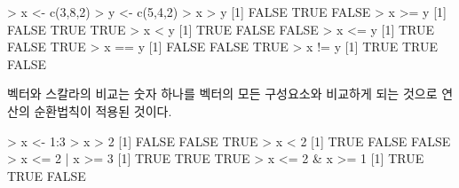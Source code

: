 \documentclass[
]{book}
\newenvironment{Shaded}{\begin{snugshade}}{\end{snugshade}}
\newcommand{\ConstantTok}[1]{\textcolor[rgb]{0.00,0.00,0.00}{#1}}
\newcommand{\DecValTok}[1]{\textcolor[rgb]{0.00,0.00,0.81}{#1}}
\newcommand{\FunctionTok}[1]{\textcolor[rgb]{0.00,0.00,0.00}{#1}}
\newcommand{\NormalTok}[1]{#1}
\newcommand{\OtherTok}[1]{\textcolor[rgb]{0.56,0.35,0.01}{#1}}
\newcommand{\SpecialCharTok}[1]{\textcolor[rgb]{0.00,0.00,0.00}{#1}}
\begin{document}
\begin{Shaded}
\begin{Highlighting}[]
\SpecialCharTok{\textgreater{}}\NormalTok{ x }\OtherTok{\textless{}{-}} \FunctionTok{c}\NormalTok{(}\DecValTok{3}\NormalTok{,}\DecValTok{8}\NormalTok{,}\DecValTok{2}\NormalTok{)}
\SpecialCharTok{\textgreater{}}\NormalTok{ y }\OtherTok{\textless{}{-}} \FunctionTok{c}\NormalTok{(}\DecValTok{5}\NormalTok{,}\DecValTok{4}\NormalTok{,}\DecValTok{2}\NormalTok{)}
\SpecialCharTok{\textgreater{}}\NormalTok{ x }\SpecialCharTok{\textgreater{}}\NormalTok{ y}
\NormalTok{[}\DecValTok{1}\NormalTok{] }\ConstantTok{FALSE}  \ConstantTok{TRUE} \ConstantTok{FALSE}
\SpecialCharTok{\textgreater{}}\NormalTok{ x }\SpecialCharTok{\textgreater{}=}\NormalTok{ y}
\NormalTok{[}\DecValTok{1}\NormalTok{] }\ConstantTok{FALSE}  \ConstantTok{TRUE}  \ConstantTok{TRUE}
\SpecialCharTok{\textgreater{}}\NormalTok{ x }\SpecialCharTok{\textless{}}\NormalTok{ y}
\NormalTok{[}\DecValTok{1}\NormalTok{]  }\ConstantTok{TRUE} \ConstantTok{FALSE} \ConstantTok{FALSE}
\SpecialCharTok{\textgreater{}}\NormalTok{ x }\SpecialCharTok{\textless{}=}\NormalTok{ y}
\NormalTok{[}\DecValTok{1}\NormalTok{]  }\ConstantTok{TRUE} \ConstantTok{FALSE}  \ConstantTok{TRUE}
\SpecialCharTok{\textgreater{}}\NormalTok{ x }\SpecialCharTok{==}\NormalTok{ y}
\NormalTok{[}\DecValTok{1}\NormalTok{] }\ConstantTok{FALSE} \ConstantTok{FALSE}  \ConstantTok{TRUE}
\SpecialCharTok{\textgreater{}}\NormalTok{ x }\SpecialCharTok{!=}\NormalTok{ y}
\NormalTok{[}\DecValTok{1}\NormalTok{]  }\ConstantTok{TRUE}  \ConstantTok{TRUE} \ConstantTok{FALSE}
\end{Highlighting}
\end{Shaded}

벡터와 스칼라의 비교는 숫자 하나를 벡터의 모든 구성요소와 비교하게 되는 것으로 연산의 순환법칙이 적용된 것이다.

\begin{Shaded}
\begin{Highlighting}[]
\SpecialCharTok{\textgreater{}}\NormalTok{ x }\OtherTok{\textless{}{-}} \DecValTok{1}\SpecialCharTok{:}\DecValTok{3}
\SpecialCharTok{\textgreater{}}\NormalTok{ x }\SpecialCharTok{\textgreater{}} \DecValTok{2}
\NormalTok{[}\DecValTok{1}\NormalTok{] }\ConstantTok{FALSE} \ConstantTok{FALSE}  \ConstantTok{TRUE}
\SpecialCharTok{\textgreater{}}\NormalTok{ x }\SpecialCharTok{\textless{}} \DecValTok{2}
\NormalTok{[}\DecValTok{1}\NormalTok{]  }\ConstantTok{TRUE} \ConstantTok{FALSE} \ConstantTok{FALSE}
\SpecialCharTok{\textgreater{}}\NormalTok{ x }\SpecialCharTok{\textless{}=} \DecValTok{2} \SpecialCharTok{|}\NormalTok{ x }\SpecialCharTok{\textgreater{}=} \DecValTok{3}
\NormalTok{[}\DecValTok{1}\NormalTok{] }\ConstantTok{TRUE} \ConstantTok{TRUE} \ConstantTok{TRUE}
\SpecialCharTok{\textgreater{}}\NormalTok{ x }\SpecialCharTok{\textless{}=} \DecValTok{2} \SpecialCharTok{\&}\NormalTok{ x }\SpecialCharTok{\textgreater{}=} \DecValTok{1}
\NormalTok{[}\DecValTok{1}\NormalTok{]  }\ConstantTok{TRUE}  \ConstantTok{TRUE} \ConstantTok{FALSE}
\end{Highlighting}
\end{Shaded}
\end{document}
